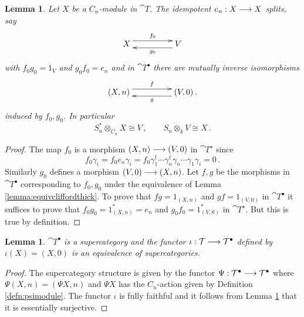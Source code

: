 \documentclass[english,letter paper,12pt,leqno]{article}
\newtheorem{lemma}[theorem]{Lemma}
\theoremstyle{example}
\newtheorem{remark}[theorem]{Remark}
\numberwithin{equation}{section}
\def\be{\begin{equation}}
\def\ee{\end{equation}}
\begin{document}
\begin{lemma}\label{lemma:whackamole} Let $X$ be a $C_n$-module in $\cat{T}$. The idempotent $e_n: X \longrightarrow X$ splits, say 
\[
\xymatrix@C+2pc{
X \ar@<1ex>[r]^-{f_0} & V \ar@<1ex>[l]^-{g_0}
}
\]
with $f_0 g_0 = 1_V$ and $g_0 f_0 = e_n$ and in $\cat{T}^\bullet$ there are mutually inverse isomorphisms
\[
\xymatrix@C+2pc{
(X, n) \ar@<1ex>[r]^-{f} & (V,0) \ar@<1ex>[l]^-{g}\,.
}
\]
induced by $f_0,g_0$. In particular
\be
S_n^* \otimes_{C_n} X \cong V\,, \qquad S_n \otimes_k V \cong X\,.
\ee
\end{lemma}
\begin{proof}
The map $f_0$ is a morphism $(X,n) \longrightarrow (V,0)$ in $\cat{T}^{\star}$ since
\[
f_0 \gamma_i = f_0 e_n \gamma_i = f_0 \gamma_1^\dagger \cdots \gamma_n^\dagger \gamma_n \cdots \gamma_1 \gamma_i = 0\,.
\]
Similarly $g_0$ defines a morphism $(V,0) \longrightarrow (X,n)$. Let $f,g$ be the morphisms in $\cat{T}^\bullet$ corresponding to $f_0,g_0$ under the equivalence of Lemma \ref{lemma:equivcliffordthick}. To prove that $fg = 1_{(X,n)}$ and $gf = 1_{(V,0)}$ in $\cat{T}^{\bullet}$ it suffices to prove that $f_0 g_0 = 1^*_{(X,n)} = e_n$ and $g_0 f_0 = 1^*_{(V,0)}$ in $\cat{T}^{\star}$. But this is true by definition.
\end{proof}

\begin{lemma}\label{lemma:embedcliffordthick} $\cat{T}^\bullet$ is a supercategory and the functor $\iota: \mathcal{T} \longrightarrow \mathcal{T}^\bullet$ defined by $\iota(X) = (X,0)$ is an equivalence of supercategories.
\end{lemma}
\begin{proof}
The supercategory structure is given by the functor $\Psi: \mathcal{T}^\bullet \longrightarrow \mathcal{T}^\bullet$ where $\Psi(X,n) = ( \Psi X, n )$ and $\Psi X$ has the $C_n$-action given by Definition \ref{defn:psimodule}. The functor $\iota$ is fully faithful and it follows from Lemma \ref{lemma:whackamole} that it is essentially surjective.
\end{proof}

\end{document}
